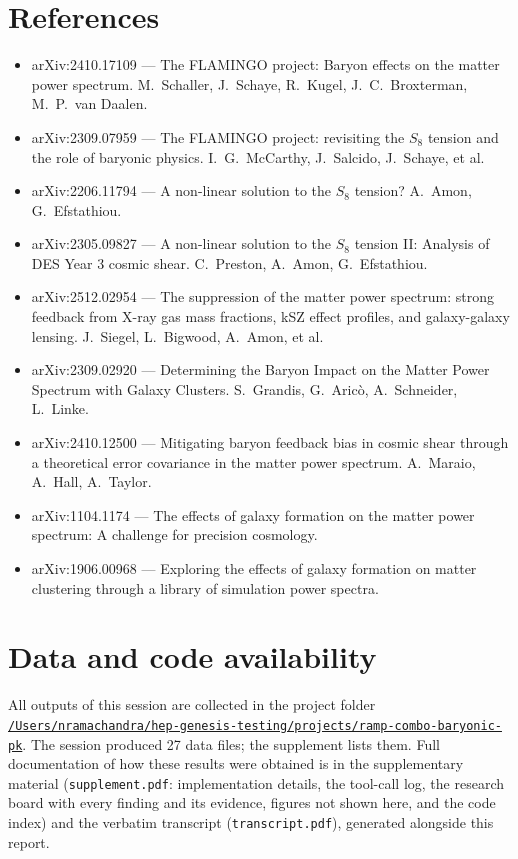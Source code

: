 \documentclass[11pt,a4paper]{article}
\begin{document}
\section*{References}
\begin{itemize}
\item arXiv:2410.17109 --- The FLAMINGO project: Baryon effects on the matter power spectrum. M.~Schaller, J.~Schaye, R.~Kugel, J.~C.~Broxterman, M.~P.~van Daalen.
\item arXiv:2309.07959 --- The FLAMINGO project: revisiting the $S_8$ tension and the role of baryonic physics. I.~G.~McCarthy, J.~Salcido, J.~Schaye, et al.
\item arXiv:2206.11794 --- A non-linear solution to the $S_8$ tension? A.~Amon, G.~Efstathiou.
\item arXiv:2305.09827 --- A non-linear solution to the $S_8$ tension II: Analysis of DES Year 3 cosmic shear. C.~Preston, A.~Amon, G.~Efstathiou.
\item arXiv:2512.02954 --- The suppression of the matter power spectrum: strong feedback from X-ray gas mass fractions, kSZ effect profiles, and galaxy-galaxy lensing. J.~Siegel, L.~Bigwood, A.~Amon, et al.
\item arXiv:2309.02920 --- Determining the Baryon Impact on the Matter Power Spectrum with Galaxy Clusters. S.~Grandis, G.~Aric\`o, A.~Schneider, L.~Linke.
\item arXiv:2410.12500 --- Mitigating baryon feedback bias in cosmic shear through a theoretical error covariance in the matter power spectrum. A.~Maraio, A.~Hall, A.~Taylor.
\item arXiv:1104.1174 --- The effects of galaxy formation on the matter power spectrum: A challenge for precision cosmology.
\item arXiv:1906.00968 --- Exploring the effects of galaxy formation on matter clustering through a library of simulation power spectra.
\end{itemize}

\section*{Data and code availability}
All outputs of this session are collected in the project folder \href{file:///Users/nramachandra/hep-genesis-testing/projects/ramp-combo-baryonic-pk}{\texttt{/\allowbreak{}Users/\allowbreak{}nramachandra/\allowbreak{}hep-genesis-testing/\allowbreak{}projects/\allowbreak{}ramp-combo-baryonic-pk}}.
The session produced 27 data files; the supplement lists them.
Full documentation of how these results were obtained is in the supplementary material (\texttt{supplement.pdf}: implementation details, the tool-call log, the research board with every finding and its evidence, figures not shown here, and the code index) and the verbatim transcript (\texttt{transcript.pdf}), generated alongside this report.
\end{document}
